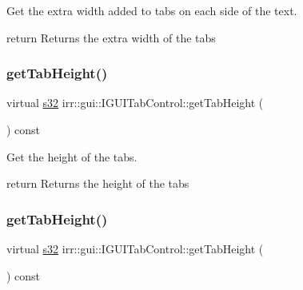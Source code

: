 Get the extra width added to tabs on each side of the text. 

return Returns the extra width of the tabs \mbox{\label{classirr_1_1gui_1_1IGUITabControl_aff6b4e0bd1a4b641fd0e3c73a0500d72}} 
\subsubsection{\texorpdfstring{get\+Tab\+Height()}{getTabHeight()}\hspace{0.1cm}{\footnotesize\ttfamily [1/2]}}
{\footnotesize\ttfamily virtual \hyperlink{namespaceirr_ac66849b7a6ed16e30ebede579f9b47c6}{s32} irr\+::gui\+::\+I\+G\+U\+I\+Tab\+Control\+::get\+Tab\+Height (\begin{DoxyParamCaption}{ }\end{DoxyParamCaption}) const\hspace{0.3cm}{\ttfamily [pure virtual]}}



Get the height of the tabs. 

return Returns the height of the tabs \mbox{\label{classirr_1_1gui_1_1IGUITabControl_aff6b4e0bd1a4b641fd0e3c73a0500d72}} 
\subsubsection{\texorpdfstring{get\+Tab\+Height()}{getTabHeight()}\hspace{0.1cm}{\footnotesize\ttfamily [2/2]}}
{\footnotesize\ttfamily virtual \hyperlink{namespaceirr_ac66849b7a6ed16e30ebede579f9b47c6}{s32} irr\+::gui\+::\+I\+G\+U\+I\+Tab\+Control\+::get\+Tab\+Height (\begin{DoxyParamCaption}{ }\end{DoxyParamCaption}) const\hspace{0.3cm}{\ttfamily [pure virtual]}}



